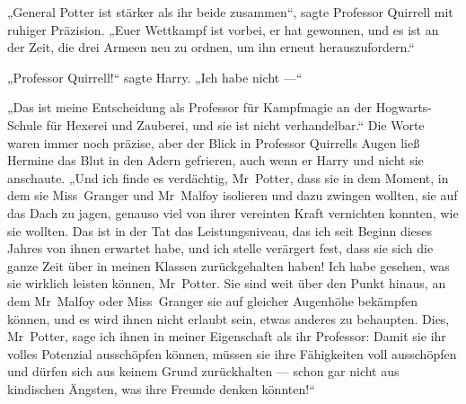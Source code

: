 „General Potter ist stärker als ihr beide zusammen“, sagte Professor Quirrell mit ruhiger Präzision.
„Euer Wettkampf ist vorbei, er hat gewonnen, und es ist an der Zeit, die drei Armeen neu zu ordnen, um ihn erneut herauszufordern.“

„Professor Quirrell!“ sagte Harry.
„Ich habe nicht —“

„Das ist meine Entscheidung als Professor für Kampfmagie an der Hogwarts-Schule für Hexerei und Zauberei, und sie ist nicht verhandelbar.“ Die Worte waren immer noch präzise, aber der Blick in Professor Quirrells Augen ließ Hermine das Blut in den Adern gefrieren, auch wenn er Harry und nicht sie anschaute.
„Und ich finde es verdächtig, Mr~Potter, dass sie in dem Moment, in dem sie Miss~Granger und Mr~Malfoy isolieren und dazu zwingen wollten, sie auf das Dach zu jagen, genauso viel von ihrer vereinten Kraft vernichten konnten, wie sie wollten. Das ist in der Tat das Leistungsniveau, das ich seit Beginn dieses Jahres von ihnen erwartet habe, und ich stelle verärgert fest, dass sie sich die ganze Zeit über in meinen Klassen zurückgehalten haben! Ich habe gesehen, was sie wirklich leisten können, Mr~Potter. Sie sind weit über den Punkt hinaus, an dem Mr~Malfoy oder Miss~Granger sie auf gleicher Augenhöhe bekämpfen können, und es wird ihnen nicht erlaubt sein, etwas anderes zu behaupten. Dies, Mr~Potter, sage ich ihnen in meiner Eigenschaft als ihr Professor: Damit sie ihr volles Potenzial ausschöpfen können, müssen sie ihre Fähigkeiten voll ausschöpfen und dürfen sich aus keinem Grund zurückhalten — schon gar nicht aus kindischen Ängsten, was ihre Freunde denken könnten!“


